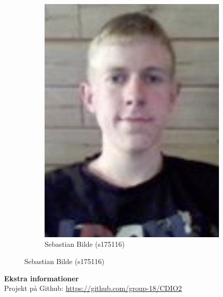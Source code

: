 \begin{figure}[H]
\begin{subfigure}{0.25\textwidth}
		\includegraphics[width=\linewidth]{graphics/members/sebastian}
		\caption*{Sebastian Bilde (s175116)}
	\end{subfigure}
\end{figure}

\vspace{1.2cm}
\noindent
{\huge\textbf{Ekstra informationer}}\\

\noindent
Projekt på Github: \url{https://github.com/group-18/CDIO2}

